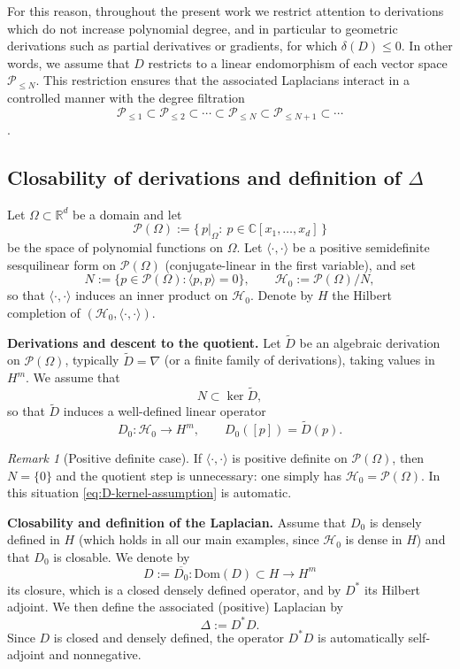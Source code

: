 \documentclass{amsart}
\numberwithin{equation}{section}
\theoremstyle{definition}
\theoremstyle{remark}
\newtheorem{remark}[theorem]{Remark}
\begin{document}
For this reason, throughout the present work we restrict attention to derivations which
do not increase polynomial degree, and in particular to geometric derivations such as
partial derivatives or gradients, for which $\delta(D)\le 0$. In other words, we assume that $D$ restricts to a linear endomorphism of each vector space $\mathcal{P}_{\leq N}.$ 
This restriction ensures that the associated Laplacians interact in a controlled manner
with the degree filtration $$\mathcal{P}_{\leq 1} \subset \mathcal{P}_{\leq 2} \subset \cdots \subset \mathcal{P}_{\leq N} \subset \mathcal{P}_{\leq N+1} \subset \cdots $$.
\subsection{Closability of derivations and definition of $\Delta$}

Let $\Omega\subset\mathbb R^d$ be a domain and let
\[
\mathcal P(\Omega):=\{\,p|_\Omega:\ p\in\mathbb C[x_1,\dots,x_d]\,\}
\]
be the space of polynomial functions on $\Omega$.
Let $\langle\cdot,\cdot\rangle$ be a positive semidefinite sesquilinear form on $\mathcal P(\Omega)$
(conjugate-linear in the first variable), and set
\[
N:=\{p\in\mathcal P(\Omega):\langle p,p\rangle=0\},\qquad
\mathcal H_0:=\mathcal P(\Omega)/N,
\]
so that $\langle\cdot,\cdot\rangle$ induces an inner product on $\mathcal H_0$.
Denote by $H$ the Hilbert completion of $(\mathcal H_0,\langle\cdot,\cdot\rangle)$.

\medskip
\noindent\textbf{Derivations and descent to the quotient.}
Let $\widetilde D$ be an algebraic derivation on $\mathcal P(\Omega)$, typically $\widetilde D=\nabla$
(or a finite family of derivations), taking values in $H^m$.
We assume that
\begin{equation}\label{eq:D-kernel-assumption}
N\subset\ker \widetilde D,
\end{equation}
so that $\widetilde D$ induces a well-defined linear operator
\[
D_0:\mathcal H_0\to H^m,\qquad D_0([p])=\widetilde D(p).
\]

\begin{remark}[Positive definite case]
If $\langle\cdot,\cdot\rangle$ is positive definite on $\mathcal P(\Omega)$, then $N=\{0\}$
and the quotient step is unnecessary: one simply has $\mathcal H_0=\mathcal P(\Omega)$.
In this situation \eqref{eq:D-kernel-assumption} is automatic.
\end{remark}

\medskip
\noindent\textbf{Closability and definition of the Laplacian.}
Assume that $D_0$ is densely defined in $H$ (which holds in all our main examples,
since $\mathcal H_0$ is dense in $H$) and that $D_0$ is closable.
We denote by
\[
D:=\overline{D_0}: \mathrm{Dom}(D)\subset H\to H^m
\]
its closure, which is a closed densely defined operator, and by $D^*$ its Hilbert adjoint.
We then define the associated (positive) Laplacian by
\begin{equation}\label{eq:defDelta}
\Delta:=D^*D.
\end{equation}
Since $D$ is closed and densely defined, the operator $D^*D$ is automatically self-adjoint and nonnegative.
\end{document}

